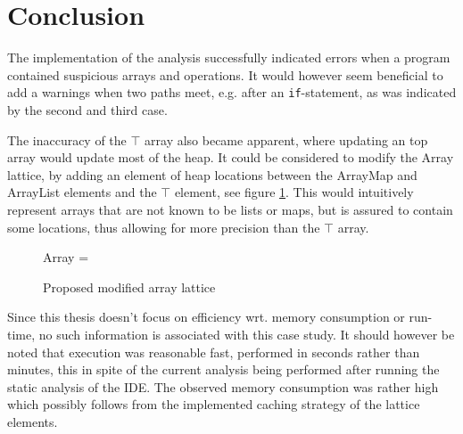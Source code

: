 \newpage\section{Conclusion}

The implementation of the analysis successfully indicated errors when a program contained suspicious arrays and operations. It would however seem beneficial to add a warnings when two paths meet, e.g. after an \texttt{if}-statement, as was indicated by the second and third case. 

The inaccuracy of the $\top$ array also became apparent, where updating an top array would update most of the heap. It could be considered to modify the Array lattice, by adding an element of heap locations between the ArrayMap and ArrayList elements and the $\top$ element, see figure \ref{fig:newArray}. This would intuitively represent arrays that are not known to be lists or maps, but is assured to contain some locations, thus allowing for more precision than the $\top$ array. 

\begin{figure}
\centering
Array = 
\caption{Proposed modified array lattice}
\label{fig:newArray}
\end{figure}

Since this thesis doesn't focus on efficiency wrt. memory consumption or run-time, no such information is associated with this case study. It should however be noted that execution was reasonable fast, performed in seconds rather than minutes, this in spite of the current analysis being performed after running the static analysis of the IDE. The observed memory consumption was rather high which possibly follows from the implemented caching strategy of the lattice elements.  
